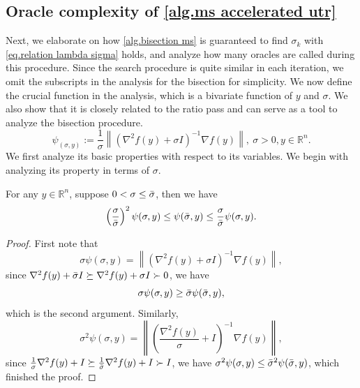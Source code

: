\documentclass{article}
\begin{document}
\subsection{Oracle complexity of \autoref{alg.ms accelerated utr}}
Next, we elaborate on how \autoref{alg.bisection ms} is guaranteed to find $\sigma_k$ with \eqref{eq.relation lambda sigma} holds, and analyze how many oracles are called during this procedure. Since the search procedure is quite similar in each iteration, we omit the subscripts in the analysis for the bisection for simplicity. We now define the crucial function in the analysis, which is a bivariate function of $y$ and $\sigma$. We also show that it is closely related to the ratio pass and can serve as a tool to analyze the bisection procedure.
\begin{equation}
    \label{eq.linesearch quantity}
    \psi_(\sigma,y) := \frac{1}{\sigma}\left \| \left(\nabla^2 f(y)+\sigma I \right)^{-1}\nabla f(y)\right \|, \ \sigma>0, y\in\mathbb{R}^n.
\end{equation}
We first analyze its basic properties with respect to its variables. We begin with analyzing its property in terms of $\sigma$.
\begin{lemma}
    \label{lem.psi property wrt sigma}
    For any $y\in\mathbb{R}^n$, suppose $0<\sigma\leq \Bar{\sigma}$, then we have
    \begin{equation}
        \label{eq.psi property wrt sigma}
        \left(\frac{\sigma}{\Bar{\sigma}}\right)^2 \psi(\sigma,y)\leq \psi(\Bar{\sigma},y) \leq \frac{\sigma}{\Bar{\sigma}}\psi(\sigma,y).
    \end{equation}
\end{lemma}
\begin{proof}
    First note that 
    \begin{equation*}
        \sigma \psi(\sigma,y) = \left \| \left(\nabla^2 f(y)+\sigma I \right)^{-1}\nabla f(y)\right \|,
    \end{equation*}
    since $\nabla^2 f(y)+\Bar{\sigma} I\succeq \nabla^2 f(y)+\sigma I \succ 0$, we have
    \begin{equation*}
        \sigma \psi(\sigma,y) \geq \Bar{\sigma} \psi(\Bar{\sigma},y),
    \end{equation*}
    which is the second argument. Similarly,
    \begin{equation*}
        \sigma^2 \psi(\sigma,y) = \left \| \left(\frac{\nabla^2 f(y)}{\sigma}+ I \right)^{-1}\nabla f(y)\right \|,
    \end{equation*}
    since $\frac{1}{\sigma}\nabla^2 f(y)+I\succeq \frac{1}{\Bar{\sigma}}\nabla^2 f(y)+I\succ I$, we have $\sigma^2 \psi(\sigma,y)\leq \Bar{\sigma}^2 \psi(\Bar{\sigma},y)$, which finished the proof.
\end{proof}
\end{document}
